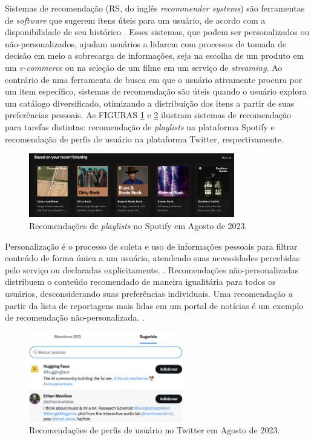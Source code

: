 Sistemas de recomendação (RS, do inglês \textit{recommender systems}) são
ferramentas de \textit{software} que sugerem itens úteis para um usuário, de
acordo com a disponibilidade de seu histórico \cite{ricci2010introduction}. Esses
sistemas, que podem ser personalizados ou não-personalizados, ajudam usuários a
lidarem com processos de tomada de decisão em meio a sobrecarga de informações,
seja na escolha de um produto em um \textit{e-commerce} ou na seleção de um
filme em um serviço de \textit{streaming}. Ao contrário de uma ferramenta de
busca em que o usuário ativamente procura por um item específico, sistemas de
recomendação são úteis quando o usuário explora um catálogo diversificado,
otimizando a distribuição dos itens a partir de suas preferências pessoais. As
FIGURAS \ref{fig:spotify} e \ref{fig:twitter} ilustram sistemas de recomendação
para tarefas distintas: recomendação de \textit{playlists} na plataforma Spotify
e recomendação de perfis de usuário na plataforma Twitter, respectivamente.


\begin{figure}[ht]
    \centering
    \includegraphics[width=0.8\textwidth]{chapters/chap01/images/spotify.png}
    \caption{Recomendações de \textit{playlists} no Spotify em Agosto de 2023.}
    \label{fig:spotify}
\end{figure}


Personalização é o processo de coleta e uso de informações pessoais para filtrar
conteúdo de forma única a um usuário, atendendo suas necessidades percebidas
pelo serviço ou declaradas explicitamente. \cite{liang2006personalized}.
Recomendações não-personalizadas distribuem o conteúdo recomendado de maneira
igualitária para todos os usuários, desconsiderando suas preferências
individuais. Uma recomendação a partir da lista de reportagens mais lidas em um
portal de notícias é um exemplo de recomendação não-personalizada.
\cite{falk2019practical}.

\begin{figure}[ht]
    \centering
    \includegraphics[width=0.6\textwidth]{chapters/chap01/images/tt.png}
    \caption{Recomendações de perfis de usuário no Twitter em Agosto de 2023.}
    \label{fig:twitter}
\end{figure}

